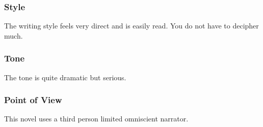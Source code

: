 \subsubsection{Style}

The writing style feels very direct and is easily read. You do not have to decipher much.

\subsubsection{Tone}

The tone is quite dramatic but serious.

\subsubsection{Point of View}

This novel uses a third person limited omniscient narrator.

